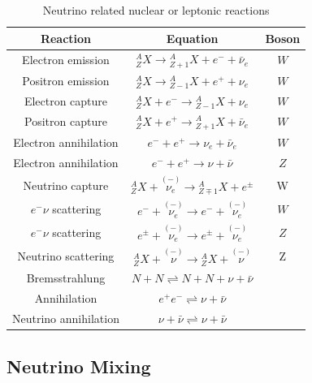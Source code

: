 \documentclass{sciposter}
\begin{document}
\begin{multicols}{3}
\begin{table}[ht]
\centering
 \begin{tabular}{|c | c | c|} 
 \hline
 Reaction & Equation & Boson   \\ [0.5ex] 
 \hline
 Electron emission & ${}^A_Z X \to {}^A_{Z+1}X + e^- +\bar \nu_e$ & $W$  \\ 
 Positron emission & ${}^A_Z X \to {}^A_{Z-1}X + e^+ + \nu_e$ & $W$  \\
 Electron capture & ${}^A_Z X + e^- \to {}^A_{Z-1}X  + \nu_e$ &  $W$ \\
 Positron capture & ${}^A_Z X + e^+ \to {}^A_{Z+1}X  + \bar\nu_e$ &  $W$ \\
 [0.5ex] 
 \hline

 Electron annihilation &  $e^- + e^+  \to \nu_e + \bar\nu_e $  & $W$ \\
 Electron annihilation &  $e^- + e^+  \to \nu + \bar\nu $  & $Z$ \\
 [0.5ex] 
 \hline

  Neutrino capture & ${}^A_{Z}X + \overset{(-)}{\nu_e} \to {}^A_{Z\mp 1}X + e^\pm $ & W\\
  [1ex] 
 \hline
 $e^-\nu$ scattering & $e^- + \overset{(-)}{\nu_e} \to e^- + \overset{(-)}{\nu_e} $ &  $W$ \\
 $e^-\nu$ scattering & $e^{\pm} + \overset{(-)}{\nu_e} \to e^{\pm} + \overset{(-)}{\nu_e} $ &  $Z$ \\
 Neutrino scattering & $ {}^A_Z X + \overset{(-)}{\nu} \to {}^A_Z X + \overset{(-)}{\nu} $ &  Z\\
 [0.5ex] 
 \hline
 
 Bremsstrahlung & $N+N\rightleftharpoons N+N + \nu + \bar\nu$ & \\
 Annihilation & $e^+e^- \rightleftharpoons \nu + \bar \nu$   & \\
 Neutrino annihilation & $\nu + \bar \nu  \rightleftharpoons \nu + \bar \nu $   &  \\
 [0.5ex] 
 \hline
 \end{tabular}
 \caption{Neutrino related nuclear or leptonic reactions}
\label{table:Neutrino_Reactions}
\end{table}



\subsection{Neutrino Mixing}


\end{multicols}
\end{document}
